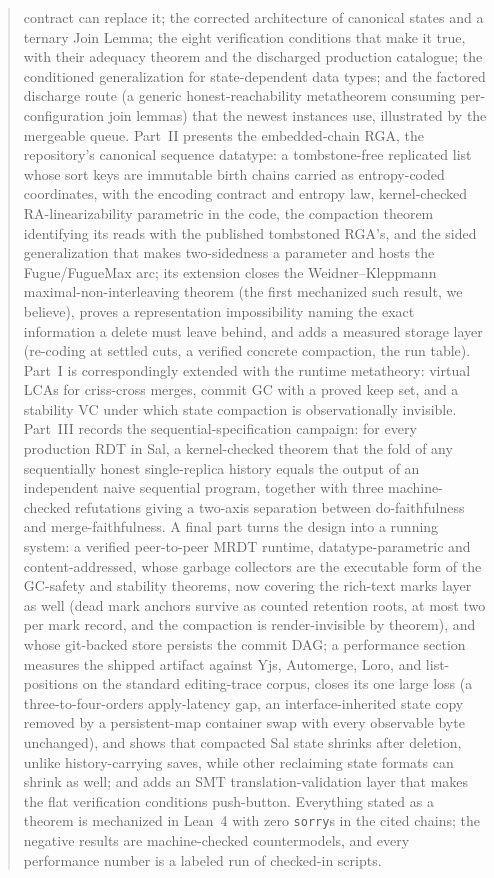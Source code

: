 \documentclass[11pt]{article}
\newcommand{\lean}[1]{\texttt{#1}}
\begin{document}
\begin{abstract}
contract can replace it; the corrected architecture of canonical states
and a ternary Join Lemma; the eight verification conditions that make it
true, with their adequacy theorem and the discharged production
catalogue; the conditioned generalization for state-dependent data
types; and the factored discharge route (a generic honest-reachability
metatheorem consuming per-configuration join lemmas) that the newest
instances use, illustrated by the mergeable queue. Part~II
presents the embedded-chain RGA, the repository's canonical sequence
datatype: a tombstone-free replicated list whose sort keys are immutable
birth chains carried as entropy-coded coordinates, with the encoding
contract and entropy law, kernel-checked RA-linearizability parametric
in the code, the compaction theorem identifying its reads with the
published tombstoned RGA's, and the sided generalization that makes
two-sidedness a parameter and hosts the Fugue/FugueMax arc; its
extension closes the Weidner--Kleppmann maximal-non-interleaving
theorem (the first mechanized such result, we believe), proves a
representation impossibility naming the exact information a delete must
leave behind, and adds a measured storage layer (re-coding at settled
cuts, a verified concrete compaction, the run table). Part~I is
correspondingly extended with the runtime metatheory: virtual LCAs for
criss-cross merges, commit GC with a proved keep set, and a stability
VC under which state compaction is observationally invisible. Part~III
records the sequential-specification campaign: for every production RDT
in Sal, a kernel-checked theorem that the fold of any sequentially
honest single-replica history equals the output of an independent naive
sequential program, together with three machine-checked refutations
giving a two-axis separation between do-faithfulness and
merge-faithfulness. A final part turns the design into a running system:
a verified peer-to-peer MRDT runtime, datatype-parametric and
content-addressed, whose garbage collectors are the executable form of
the GC-safety and stability theorems, now covering the rich-text marks
layer as well (dead mark anchors survive as counted retention roots,
at most two per mark record, and the compaction is render-invisible by
theorem), and whose git-backed store persists
the commit DAG; a performance section measures the shipped artifact
against Yjs, Automerge, Loro, and list-positions on the standard
editing-trace corpus, closes its one large loss (a three-to-four-orders
apply-latency gap, an interface-inherited state copy removed by a
persistent-map container swap with every observable byte unchanged), and
shows that compacted Sal state shrinks after deletion, unlike
history-carrying saves, while other reclaiming state formats can shrink as
well; and adds an SMT
translation-validation layer that makes the flat verification conditions
push-button. Everything stated as a theorem is mechanized in
Lean~4 with zero \lean{sorry}s in the cited chains; the negative results
are machine-checked countermodels, and every performance number is a
labeled run of checked-in scripts.
\fi\fi
\end{abstract}
\end{document}
